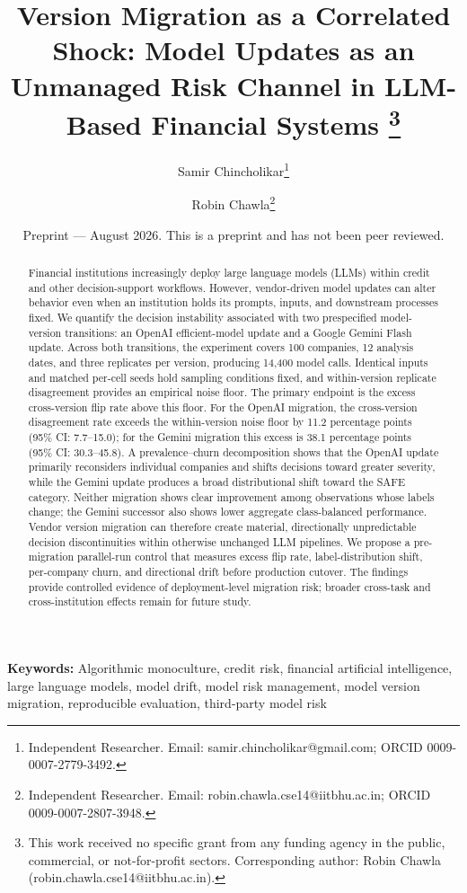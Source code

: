 \documentclass[11pt]{article}
\title{\textbf{Version Migration as a Correlated Shock: Model Updates as an Unmanaged Risk Channel in LLM-Based Financial Systems}%
\thanks{This work received no specific grant from any funding agency in the public, commercial, or not-for-profit sectors. Corresponding author: Robin Chawla (robin.chawla.cse14@iitbhu.ac.in).}}
\author{Samir Chincholikar\thanks{Independent Researcher. Email: samir.chincholikar@gmail.com; ORCID 0009-0007-2779-3492.}
\and Robin Chawla\thanks{Independent Researcher. Email: robin.chawla.cse14@iitbhu.ac.in; ORCID 0009-0007-2807-3948.}}
\date{Preprint --- August 2026. This is a preprint and has not been peer reviewed.}
\begin{document}
\maketitle

\begin{abstract}
Financial institutions increasingly deploy large language models (LLMs) within credit and other decision-support workflows. However, vendor-driven model updates can alter behavior even when an institution holds its prompts, inputs, and downstream processes fixed. We quantify the decision instability associated with two prespecified model-version transitions: an OpenAI efficient-model update and a Google Gemini Flash update. Across both transitions, the experiment covers 100 companies, 12 analysis dates, and three replicates per version, producing 14,400 model calls. Identical inputs and matched per-cell seeds hold sampling conditions fixed, and within-version replicate disagreement provides an empirical noise floor. The primary endpoint is the excess cross-version flip rate above this floor. For the OpenAI migration, the cross-version disagreement rate exceeds the within-version noise floor by 11.2 percentage points (95\% CI: 7.7--15.0); for the Gemini migration this excess is 38.1 percentage points (95\% CI: 30.3--45.8). A prevalence--churn decomposition shows that the OpenAI update primarily reconsiders individual companies and shifts decisions toward greater severity, while the Gemini update produces a broad distributional shift toward the SAFE category. Neither migration shows clear improvement among observations whose labels change; the Gemini successor also shows lower aggregate class-balanced performance. Vendor version migration can therefore create material, directionally unpredictable decision discontinuities within otherwise unchanged LLM pipelines. We propose a pre-migration parallel-run control that measures excess flip rate, label-distribution shift, per-company churn, and directional drift before production cutover. The findings provide controlled evidence of deployment-level migration risk; broader cross-task and cross-institution effects remain for future study.
\end{abstract}

\noindent\textbf{Keywords:} Algorithmic monoculture, credit risk, financial artificial intelligence, large language models, model drift, model risk management, model version migration, reproducible evaluation, third-party model risk

\medskip
\end{document}
